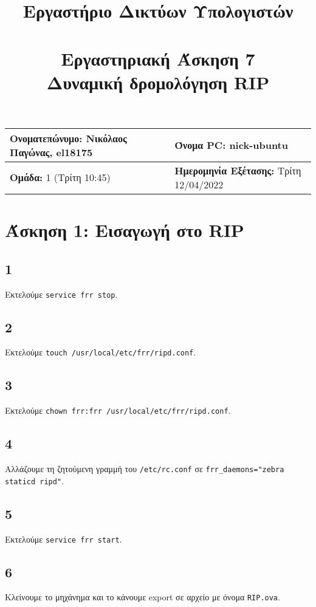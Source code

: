 \documentclass[a4paper, 12pt]{article}
\title{
	\textbf{Εργαστήριο Δικτύων Υπολογιστών} \\~\\
	Εργαστηριακή Άσκηση 7 \\ 
	Δυναμική δρομολόγηση RIP
}
\author{}
\date{}
\begin{document}
\maketitle
\begin{center}
	\begin{tabular}{|l|l|}
		\hline
		\textbf{Ονοματεπώνυμο:} Νικόλαος Παγώνας, el18175  & \textbf{Όνομα PC:} nick-ubuntu \\
		\hline
		\textbf{Ομάδα:} 1 (Τρίτη 10:45) & \textbf{Ημερομηνία Εξέτασης:} Τρίτη 12/04/2022 \\
		\hline
	\end{tabular}
\end{center}

\section*{Άσκηση 1: Εισαγωγή στο RIP}
	\subsection*{1}
		Εκτελούμε \verb|service frr stop|.
			
	\subsection*{2}
		Εκτελούμε \verb|touch /usr/local/etc/frr/ripd.conf|.

	\subsection*{3}
		Εκτελούμε \verb|chown frr:frr /usr/local/etc/frr/ripd.conf|.

	\subsection*{4}
		Αλλάζουμε τη ζητούμενη γραμμή του \verb|/etc/rc.conf| σε \verb|frr_daemons="zebra staticd ripd"|.

	\subsection*{5}
		Εκτελούμε \verb|service frr start|.

	\subsection*{6}
		Κλείνουμε το μηχάνημα και το κάνουμε export σε αρχείο με όνομα \verb|RIP.ova|. 
\end{document}
